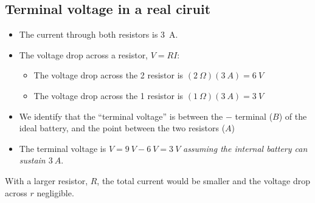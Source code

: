 \documentclass[aspectratio=169,
hyperref={colorlinks,urlcolor=blue}
]{beamer}
\begin{document}



\subsection{Terminal voltage in a real ciruit}
\label{subsec:terminalvoltageinarealcircuit}
{

\begin{itemize}
\item The current through both resistors is \SI{3}{A}.%
\item The voltage drop across a resistor, $V=RI$:
\begin{itemize}
\item The voltage drop across the \SI{2}{\Omega} resistor is $(\SI{2}{\Omega})(\SI{3}{A})=\SI{6}{V}$
\item The voltage drop across the \SI{1}{\Omega} resistor is $(\SI{1}{\Omega})(\SI{3}{A})=\SI{3}{V}$
\end{itemize}
\item We identify that the “terminal voltage” is between the $-$ terminal ($B$) of the ideal battery, and the point between the two resistors ($A$)
\item The terminal voltage is $V=\SI{9}{V}-\SI{6}{V}=\SI{3}{V}$
\textit{assuming the internal battery can sustain $\SI{3}{A}$}.
\end{itemize}
With a larger resistor, $R$, the total current would be smaller and the voltage drop across $r$ negligible. 
}
\end{document}
